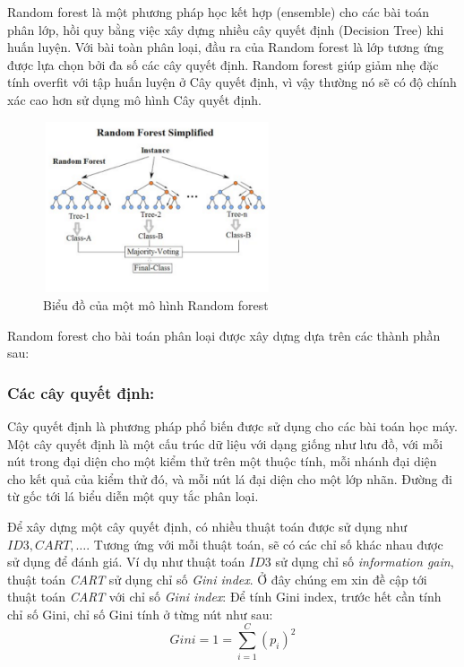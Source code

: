 Random forest là một phương pháp học kết hợp (ensemble) cho các bài toán phân lớp, hồi quy bằng việc xây dựng nhiều cây quyết định (Decision Tree) khi huấn luyện. Với bài toàn phân loại, đầu ra của Random forest là lớp tương ứng được lựa chọn bởi đa số các cây quyết định. Random forest giúp giảm nhẹ đặc tính overfit với tập huấn luyện ở Cây quyết định, vì vậy thường nó sẽ có độ chính xác cao hơn sử dụng mô hình Cây quyết định.

\begin{figure}[h!]
    \centering
    \includegraphics[width=0.6\textwidth]{figures/Random_forest_diagram_complete.png} %
    \caption{Biểu đồ của một mô hình Random forest} %
    \label{fig:2} %
\end{figure}

Random forest cho bài toán phân loại được xây dựng dựa trên các thành phần sau:
\subsubsection{Các cây quyết định:}
Cây quyết định là phương pháp phổ biến được sử dụng cho các bài toán học máy. 
Một cây quyết định là một cấu trúc dữ liệu với dạng giống như lưu đồ, với mỗi nút trong đại diện cho một kiểm thử trên một thuộc tính, mỗi nhánh đại diện cho kết quả của kiểm thử đó, và mỗi nút lá đại diện cho một lớp nhãn. Đường đi từ gốc tới lá biểu diễn một quy tắc phân loại.

Để xây dựng một cây quyết định, có nhiều thuật toán được sử dụng như $ID3, CART,\dots$. Tương ứng với mỗi thuật toán, sẽ có các chỉ số khác nhau được sử dụng để đánh giá. Ví dụ như thuật toán $ID3$ sử dụng chỉ số \emph{information gain}, thuật toán \emph{CART} sử dụng chỉ số \emph{Gini index}. Ở đây chúng em xin đề cập tới thuật toán \emph{CART} với chỉ số \emph{Gini index}:
Để tính Gini index, trước hết cần tính chỉ số Gini, chỉ số Gini tính ở từng nút như sau:
\begin{equation*}
    Gini = 1 = \sum^C_{i=1}(p_i)^2
\end{equation*}


